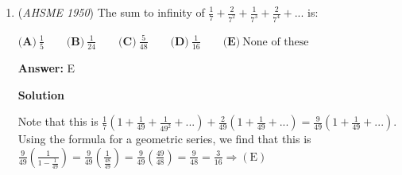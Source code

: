 \begin{enumerate}
 $\textbf{(A)}\ \infty\qquad\textbf{(B)}\ 2\qquad\textbf{(C)}\ \sqrt[4]{2}\qquad\textbf{(D)}\ \sqrt{2}\qquad\textbf{(E)}\ \text{None of these}$

 \textbf{Answer: }D



\textbf{Solution 1:}

Taking the log, we get $\log_x 2 = x^{x^{x^{.^{.^.}}}}=2$, and $\log_x 2 = 2$. Solving for x, we get $2=x^2$, and $\sqrt{2}=x \Rightarrow \mathrm{(D)}$




\textbf{Solution 2:}

$x^{x^{x^{.^{.^.}}}}=2$ is the original equation. If we let $y=x^{x^{x^{.^{.^.}}}}$, then the equation can be written as $y=2$. This also means that $x^y=2$, considering that adding one $x$ to the start and then taking that $x$ to the power of $y$ does not have an effect on the equation, since $y$ is infinitely long in terms of $x$ raised to itself forever. It is already known that $y=2$ from what we first started with, so this shows that $x^y=x^2=2$. If $x^2=2$, then that means that $\sqrt{2}=x \Rightarrow \mathrm{(D)}$.

 This is just a faster way once you get used to it, instead of taking a log of the function.

 



\textbf{Solution 3:}

Given $x^{x^{x^{.^{.^.}}}}=2$, we see that $x$ is also raised to $x^{x^{x^{.^{.^.}}}}$, so $x^2 = 2$ $\Rightarrow x=\sqrt{2} \mathrm{{D}}$



	\item (\textit{AHSME 1950}) The sum to infinity of $\frac{1}{7}+\frac{2}{7^{2}}+\frac{1}{7^{3}}+\frac{2}{7^{4}}+...$ is:


 $\textbf{(A)}\ \frac{1}{5}\qquad\textbf{(B)}\ \frac{1}{24}\qquad\textbf{(C)}\ \frac{5}{48}\qquad\textbf{(D)}\ \frac{1}{16}\qquad\textbf{(E)}\ \text{None of these}$

 \textbf{Answer: }E



\textbf{Solution}

Note that this is $\frac{1}{7}(1+\frac{1}{49}+\frac{1}{49^2}+...)+\frac{2}{49}(1+\frac{1}{49}+...)=\frac{9}{49}(1+\frac{1}{49}+...)$. Using the formula for a geometric series, we find that this is $\frac{9}{49}(\frac{1}{1-\frac{1}{49}})=\frac{9}{49}(\frac{1}{\frac{48}{49}})=\frac{9}{49}(\frac{49}{48})=\frac{9}{48}=\frac{3}{16} \Rightarrow \mathrm{(E)}$




\end{enumerate}
